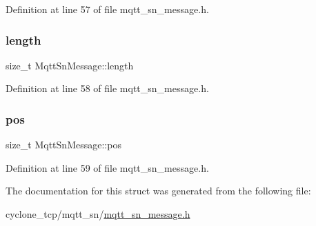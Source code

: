 Definition at line 57 of file mqtt\+\_\+sn\+\_\+message.\+h.

\mbox{\label{structMqttSnMessage_a717fa07b0fe9c37cba433a2e913332d0}} 
\subsubsection{\texorpdfstring{length}{length}}
{\footnotesize\ttfamily size\+\_\+t Mqtt\+Sn\+Message\+::length}



Definition at line 58 of file mqtt\+\_\+sn\+\_\+message.\+h.

\mbox{\label{structMqttSnMessage_aa1c2334a5ac954ee288fd66eabfb17ac}} 
\subsubsection{\texorpdfstring{pos}{pos}}
{\footnotesize\ttfamily size\+\_\+t Mqtt\+Sn\+Message\+::pos}



Definition at line 59 of file mqtt\+\_\+sn\+\_\+message.\+h.



The documentation for this struct was generated from the following file\+:\begin{DoxyCompactItemize}
\item 
cyclone\+\_\+tcp/mqtt\+\_\+sn/\hyperlink{mqtt__sn__message_8h}{mqtt\+\_\+sn\+\_\+message.\+h}\end{DoxyCompactItemize}
